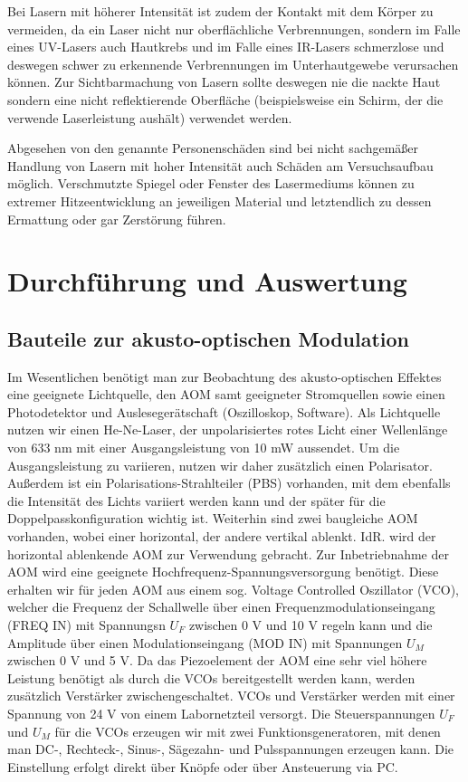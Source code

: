 \documentclass[bigchapter,colorback,accentcolor=tud4b,linedtoc,11pt]{tudreport}
\begin{document}
Bei Lasern mit höherer Intensität ist zudem der Kontakt mit dem Körper zu vermeiden, da ein Laser nicht nur oberflächliche Verbrennungen, sondern im Falle eines UV-Lasers auch Hautkrebs und im Falle eines IR-Lasers schmerzlose und deswegen schwer zu erkennende Verbrennungen im Unterhautgewebe verursachen können. Zur Sichtbarmachung von Lasern sollte deswegen nie die nackte Haut sondern eine nicht reflektierende Oberfläche (beispielsweise ein Schirm, der die verwende Laserleistung aushält) verwendet werden.

Abgesehen von den genannte Personenschäden sind bei nicht sachgemäßer Handlung von Lasern mit hoher Intensität auch Schäden am Versuchsaufbau möglich. Verschmutzte Spiegel oder Fenster des Lasermediums können zu extremer Hitzeentwicklung an jeweiligen Material und letztendlich zu dessen Ermattung oder gar Zerstörung führen. \cite{GefahrenLaser}

\chapter{Durchführung und Auswertung} %

\section{Bauteile zur akusto-optischen Modulation}

Im Wesentlichen benötigt man zur Beobachtung des akusto-optischen Effektes eine geeignete Lichtquelle, den AOM samt geeigneter Stromquellen sowie einen Photodetektor und Auslesegerätschaft (Oszilloskop, Software). Als Lichtquelle nutzen wir einen He-Ne-Laser, der unpolarisiertes rotes Licht einer Wellenlänge von 633 nm mit einer Ausgangsleistung von 10 mW aussendet. Um die Ausgangsleistung zu variieren, nutzen wir daher zusätzlich einen Polarisator. Außerdem ist ein Polarisations-Strahlteiler (PBS) vorhanden, mit dem ebenfalls die Intensität des Lichts variiert werden kann und der später für die Doppelpasskonfiguration wichtig ist. Weiterhin sind zwei baugleiche AOM vorhanden, wobei einer horizontal, der andere vertikal ablenkt. IdR. wird der horizontal ablenkende AOM zur Verwendung gebracht. Zur Inbetriebnahme der AOM wird eine geeignete Hochfrequenz-Spannungsversorgung benötigt. Diese erhalten wir für jeden AOM aus einem sog. Voltage Controlled Oszillator (VCO), welcher die Frequenz der Schallwelle über einen Frequenzmodulationseingang (FREQ IN) mit Spannungsn $U_F$ zwischen 0 V und 10 V regeln kann und die Amplitude über einen Modulationseingang (MOD IN) mit Spannungen $U_M$ zwischen 0 V und 5 V. Da das Piezoelement der AOM eine sehr viel höhere Leistung benötigt als durch die VCOs bereitgestellt werden kann, werden zusätzlich Verstärker zwischengeschaltet. VCOs und Verstärker werden mit einer Spannung von 24 V von einem Labornetzteil versorgt. Die Steuerspannungen $U_F$ und $U_M$ für die VCOs erzeugen wir mit zwei Funktionsgeneratoren, mit denen man DC-, Rechteck-, Sinus-, Sägezahn- und Pulsspannungen erzeugen kann. Die Einstellung erfolgt direkt über Knöpfe oder über Ansteuerung via PC.
\end{document}
